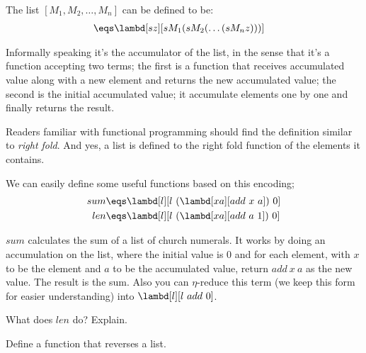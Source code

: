 \documentclass[../../../include/open-logic-section]{subfiles}
\begin{document}

The list $[M_1, M_2, \ldots, M_n]$ can be defined to be:
\begin{align*}
  [M_1, M_2, \ldots, M_n] &\eqs \lambd[sz][s M_1 (s M_2 (\ldots (s M_n z)))]
\end{align*}

Informally speaking it's the accumulator of the list, in the sense
that it's a function accepting two terms; the first is a function that receives accumulated value
along with a new element and returns the new accumulated value; the
second is the initial accumulated value; it accumulate elements one by
one and finally returns the result.

\begin{digress}
  Readers familiar with functional programming should find the
  definition similar to \emph{right fold}. And yes, a list is defined
  to the right fold function of the elements it contains.
\end{digress}

We can easily define some useful functions based on this encoding; 
\begin{align*}
  {sum} &\eqs \lambd[l][l ~ (\lambd[xa][add ~ x ~ a])~  0]\\
  len &\eqs \lambd[l][l ~ (\lambd[xa][add ~ a ~ 1]) ~ 0]
\end{align*}

$sum$ calculates the sum of a list of church numerals. It works by
doing an accumulation on the list, where the initial value is $0$ and
for each element, with $x$ to be the element and $a$ to be the
accumulated value, return $add ~ x ~ a$ as the new value. The result
is the sum. Also you can $\eta$-reduce this term (we keep this form for
easier understanding) into $\lambd[l][l ~ add ~ 0]$.

\begin{prob}
  What does $len$ do? Explain.
\end{prob}

\begin{prob}
  Define a function that reverses a list.
\end{prob}
\end{document}
